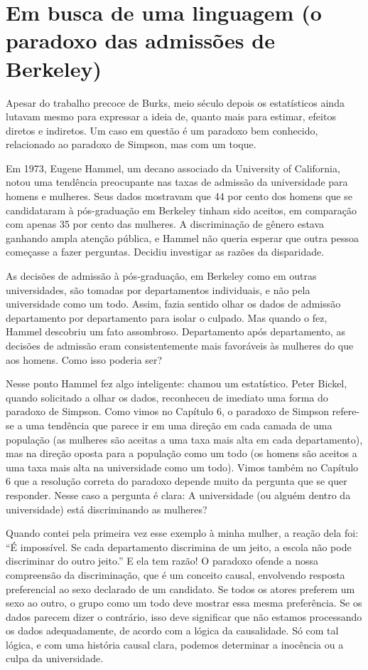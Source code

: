 \documentclass[11pt,a5paper,twoside]{book}
\begin{document}
\section{Em busca de uma linguagem (o paradoxo das admissões de Berkeley)}
Apesar do trabalho precoce de Burks, meio século depois os estatísticos ainda lutavam mesmo para expressar a ideia de, quanto mais para estimar, efeitos diretos e indiretos. Um caso em questão é um paradoxo bem conhecido, relacionado ao paradoxo de Simpson, mas com um toque.

Em 1973, Eugene Hammel, um decano associado da University of California, notou uma tendência preocupante nas taxas de admissão da universidade para homens e mulheres. Seus dados mostravam que 44 por cento dos homens que se candidataram à pós-graduação em Berkeley tinham sido aceitos, em comparação com apenas 35 por cento das mulheres. A discriminação de gênero estava ganhando ampla atenção pública, e Hammel não queria esperar que outra pessoa começasse a fazer perguntas. Decidiu investigar as razões da disparidade.

As decisões de admissão à pós-graduação, em Berkeley como em outras universidades, são tomadas por departamentos individuais, e não pela universidade como um todo. Assim, fazia sentido olhar os dados de admissão departamento por departamento para isolar o culpado. Mas quando o fez, Hammel descobriu um fato assombroso. Departamento após departamento, as decisões de admissão eram consistentemente mais favoráveis às mulheres do que aos homens. Como isso poderia ser?

Nesse ponto Hammel fez algo inteligente: chamou um estatístico. Peter Bickel, quando solicitado a olhar os dados, reconheceu de imediato uma forma do paradoxo de Simpson. Como vimos no Capítulo 6, o paradoxo de Simpson refere-se a uma tendência que parece ir em uma direção em cada camada de uma população (as mulheres são aceitas a uma taxa mais alta em cada departamento), mas na direção oposta para a população como um todo (os homens são aceitos a uma taxa mais alta na universidade como um todo). Vimos também no Capítulo 6 que a resolução correta do paradoxo depende muito da pergunta que se quer responder. Nesse caso a pergunta é clara: A universidade (ou alguém dentro da universidade) está discriminando as mulheres?

Quando contei pela primeira vez esse exemplo à minha mulher, a reação dela foi: “É impossível. Se cada departamento discrimina de um jeito, a escola não pode discriminar do outro jeito.” E ela tem razão! O paradoxo ofende a nossa compreensão da discriminação, que é um conceito causal, envolvendo resposta preferencial ao sexo declarado de um candidato. Se todos os atores preferem um sexo ao outro, o grupo como um todo deve mostrar essa mesma preferência. Se os dados parecem dizer o contrário, isso deve significar que não estamos processando os dados adequadamente, de acordo com a lógica da causalidade. Só com tal lógica, e com uma história causal clara, podemos determinar a inocência ou a culpa da universidade.
\end{document}

